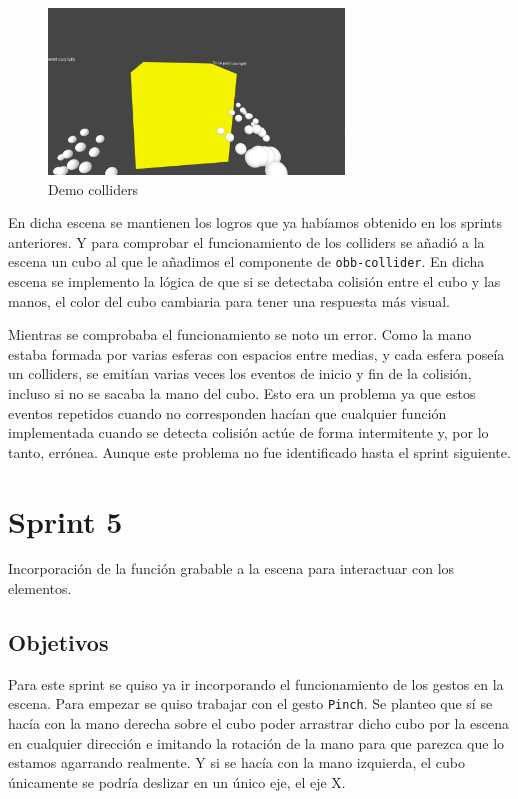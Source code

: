 \documentclass[a4paper, 12pt]{book}
\begin{document}
\begin{figure}[H] 
  \centering
  \includegraphics[width=0.7\textwidth]{img/collider.jpg} 
  \caption{Demo colliders}
  \label{fig:sprint4}
\end{figure}

En dicha escena se mantienen los logros que ya habíamos obtenido en los sprints anteriores. Y para comprobar el funcionamiento de los colliders se añadió a la escena un cubo
al que le añadimos el componente de \texttt{obb-collider}. En dicha escena se implemento la lógica de que si se detectaba colisión entre el cubo y las manos,  el color del cubo cambiaria para tener una respuesta más visual. 

Mientras se comprobaba el funcionamiento se noto un error. Como la mano estaba formada por varias esferas con espacios entre medias, y cada  esfera poseía un colliders, se emitían varias veces los eventos de inicio y fin de la colisión, incluso si no se sacaba la mano del cubo. 
Esto era un problema ya que estos eventos repetidos cuando no corresponden hacían que cualquier función implementada cuando se detecta colisión actúe de forma intermitente y, por lo tanto, errónea. Aunque este problema no fue identificado hasta el sprint siguiente. 

\section{Sprint 5}
\label{sec:sprint5}
Incorporación de la función grabable a la escena para interactuar con los elementos.

\subsection{Objetivos}
\label{subsec:objetivo-principal5}
Para este sprint se quiso ya ir incorporando el funcionamiento de los gestos en la escena. Para empezar se quiso trabajar con el gesto \texttt{Pinch}. Se planteo que sí se hacía con la mano derecha sobre el cubo poder 
arrastrar dicho cubo por la escena en cualquier dirección e imitando la rotación de la mano para que parezca que lo estamos agarrando realmente. Y si se hacía con la mano izquierda, el cubo únicamente se podría deslizar en un único eje, el eje X.
\end{document}
